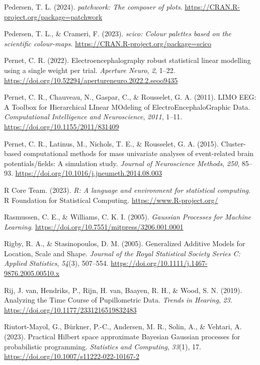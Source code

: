 \documentclass[
  doc,
  floatsintext,
  longtable,
  a4paper,
  nolmodern,
  notxfonts,
  notimes,
  colorlinks=true,linkcolor=blue,citecolor=blue,urlcolor=blue]{apa7}
\newlength{\cslhangindent}
\newenvironment{CSLReferences}[2] %
 {\begin{list}{}{%
  \setlength{\itemindent}{0pt}
  \setlength{\leftmargin}{0pt}
  \setlength{\parsep}{0pt}
  \ifodd #1
   \setlength{\leftmargin}{\cslhangindent}
   \setlength{\itemindent}{-1\cslhangindent}
  \fi
  \setlength{\itemsep}{#2\baselineskip}}}
 {\end{list}}
\begin{document}
\begin{CSLReferences}{1}{0}
Pedersen, T. L. (2024). \emph{{patchwork}: The composer of plots}.
\url{https://CRAN.R-project.org/package=patchwork}

Pedersen, T. L., \& Crameri, F. (2023). \emph{{scico}: Colour palettes
based on the scientific colour-maps}.
\url{https://CRAN.R-project.org/package=scico}

Pernet, C. R. (2022). Electroencephalography robust statistical linear
modelling using a single weight per trial. \emph{Aperture Neuro},
\emph{2}, 1--22.
\url{https://doi.org/10.52294/apertureneuro.2022.2.seoo9435}

Pernet, C. R., Chauveau, N., Gaspar, C., \& Rousselet, G. A. (2011).
LIMO EEG: A Toolbox for Hierarchical LInear MOdeling of
ElectroEncephaloGraphic Data. \emph{Computational Intelligence and
Neuroscience}, \emph{2011}, 1--11.
\url{https://doi.org/10.1155/2011/831409}

Pernet, C. R., Latinus, M., Nichols, T. E., \& Rousselet, G. A. (2015).
Cluster-based computational methods for mass univariate analyses of
event-related brain potentials/fields: A simulation study. \emph{Journal
of Neuroscience Methods}, \emph{250}, 85--93.
\url{https://doi.org/10.1016/j.jneumeth.2014.08.003}

R Core Team. (2023). \emph{{R}: A language and environment for
statistical computing}. R Foundation for Statistical Computing.
\url{https://www.R-project.org/}

Rasmussen, C. E., \& Williams, C. K. I. (2005). \emph{Gaussian Processes
for Machine Learning}.
\url{https://doi.org/10.7551/mitpress/3206.001.0001}

Rigby, R. A., \& Stasinopoulos, D. M. (2005). Generalized Additive
Models for Location, Scale and Shape. \emph{Journal of the Royal
Statistical Society Series C: Applied Statistics}, \emph{54}(3),
507--554. \url{https://doi.org/10.1111/j.1467-9876.2005.00510.x}

Rij, J. van, Hendriks, P., Rijn, H. van, Baayen, R. H., \& Wood, S. N.
(2019). Analyzing the Time Course of Pupillometric Data. \emph{Trends in
Hearing}, \emph{23}. \url{https://doi.org/10.1177/2331216519832483}

Riutort-Mayol, G., Bürkner, P.-C., Andersen, M. R., Solin, A., \&
Vehtari, A. (2023). Practical {Hilbert} space approximate {Bayesian
Gaussian} processes for probabilistic programming. \emph{Statistics and
Computing}, \emph{33}(1), 17.
\url{https://doi.org/10.1007/s11222-022-10167-2}


\end{CSLReferences}
\end{document}
